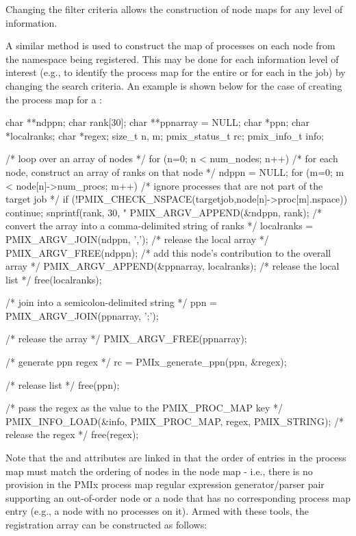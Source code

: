 Changing the filter criteria allows the construction of node maps for any level of information.

\label{cptr:api_server:ppnregex}A similar method is used to construct the map of processes on each node from the namespace being registered. This may be done for each information level of interest (e.g., to identify the process map for the entire  or for each  in the job) by changing the search criteria. An example is shown below for the case of creating the process map for a :

\cspecificstart
\begin{codepar}
char **ndppn;
char rank[30];
char **ppnarray = NULL;
char *ppn;
char *localranks;
char *regex;
size_t n, m;
pmix_status_t rc;
pmix_info_t info;

/* loop over an array of nodes */
for (n=0; n < num_nodes; n++) {
    /* for each node, construct an array of ranks on that node */
    ndppn = NULL;
    for (m=0; m < node[n]->num_procs; m++) {
        /* ignore processes that are not part of the target job */
        if (!PMIX_CHECK_NSPACE(targetjob,node[n]->proc[m].nspace)) {
            continue;
        }
        snprintf(rank, 30, "%
        PMIX_ARGV_APPEND(&ndppn, rank);
    }
    /* convert the array into a comma-delimited string of ranks */
    localranks = PMIX_ARGV_JOIN(ndppn, ',');
    /* release the local array */
    PMIX_ARGV_FREE(ndppn);
    /* add this node's contribution to the overall array */
    PMIX_ARGV_APPEND(&ppnarray, localranks);
    /* release the local list */
    free(localranks);
}

/* join into a semicolon-delimited string */
ppn = PMIX_ARGV_JOIN(ppnarray, ';');

/* release the array */
PMIX_ARGV_FREE(ppnarray);

/* generate ppn regex */
rc = PMIx_generate_ppn(ppn, &regex);

/* release list */
free(ppn);

/* pass the regex as the value to the PMIX_PROC_MAP key */
PMIX_INFO_LOAD(&info, PMIX_PROC_MAP, regex, PMIX_STRING);
/* release the regex */
free(regex);

\end{codepar}
\cspecificend

Note that the  and  attributes are linked in that the order of entries in the process map must match the ordering of nodes in the node map - i.e., there is no provision in the \ac{PMIx} process map regular expression generator/parser pair supporting an out-of-order node or a node that has no corresponding process map entry (e.g., a node with no processes on it). Armed with these tools, the registration  array can be constructed as follows:

